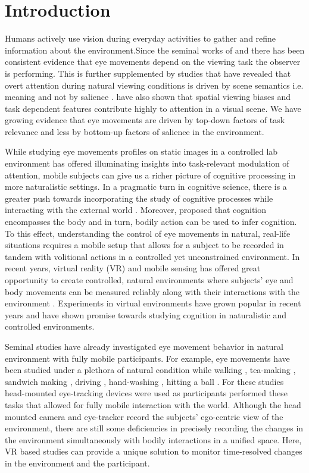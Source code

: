 \section{Introduction}

Humans actively use vision during everyday activities to gather and refine information about the environment.Since the seminal works of \citet{Yarbus2013-eu} and \citet{Buswell1935-di} there has been consistent evidence that eye movements depend on the viewing task the observer is performing. This is further supplemented by studies that have revealed that overt attention during natural viewing conditions is driven by scene semantics i.e. meaning and not by salience \citet{Henderson2017-it}. \citet{Kollmorgen2010-wg} have also shown that spatial viewing biases and task dependent features contribute highly to attention in a visual scene. We have growing evidence that eye movements are driven by top-down factors of task relevance and less by bottom-up factors of salience in the environment.

While studying eye movements profiles on static images in a controlled lab environment has offered illuminating insights into task-relevant modulation of attention, mobile subjects can give us a richer picture of cognitive processing in more naturalistic settings. In a pragmatic turn in cognitive science, there is a greater push towards incorporating the study of cognitive processes while interacting with the external world \citet{Parada2020-ys}. Moreover, \citet{Engel2013-bx} proposed that cognition encompasses the body and in turn, bodily action can be used to infer cognition. To this effect, understanding the control of eye movements in natural, real-life situations requires a mobile setup that allows for a subject to be recorded in tandem with volitional actions in a controlled yet unconstrained environment. In recent years, virtual reality (VR) and mobile sensing has offered great opportunity to create controlled, natural environments where subjects' eye and body movements can be measured reliably along with their interactions with the environment \citep{Keshava2020-cp, Clay2019-cu, Mann2019-ls}. Experiments in virtual environments have grown popular in recent years and have shown promise towards studying cognition in naturalistic and controlled environments.

Seminal studies have already investigated eye movement behavior in natural environment with fully mobile participants. For example, eye movements have been studied under a plethora of natural condition while walking \citep{Matthis2018-ho}, tea-making \citep{Land1999-ol} , sandwich making \citep{Hayhoe2003-lw} , driving \citep{Mars2012-bn, Sullivan2012-gg}, hand-washing \citep{Pelz2001-cn} , hitting a ball \citep{Land2000-pw}. For these studies head-mounted eye-tracking devices were used as participants performed these tasks that allowed for fully mobile interaction with the world. Although the head mounted camera and eye-tracker record the subjects' ego-centric view of the environment, there are still some deficiencies in precisely recording the changes in the environment simultaneously with bodily interactions in a unified space. Here, VR based studies can provide a unique solution to monitor time-resolved changes in the environment and the participant.

